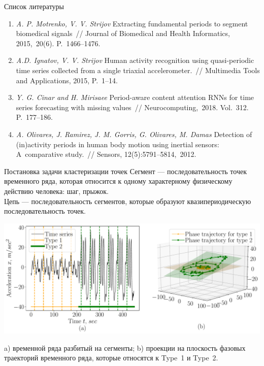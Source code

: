 \documentclass[9pt,pdf,hyperref={unicode}]{beamer}
\begin{document}
\begin{frame}{Список литературы}
	\begin{enumerate}
	\justifying
		\item \textit{A. P. Motrenko, V. V. Strijov} Extracting fundamental periods to segment biomedical signals~// Journal of Biomedical and Health Informatics, 2015,~20(6). P.~1466--1476.
		\item \textit{A.D. Ignatov, V. V. Strijov} Human activity recognition using quasi-periodic time series collected from a single triaxial accelerometer.~// Multimedia Tools and Applications, 2015, P.~1--14.

		
		\item \textit{Y. G. Cinar and H. Mirisaee} Period-aware content attention RNNs for time series forecasting with missing values~// Neurocomputing,~2018. Vol.~312. P.~177--186.
		
		\item \textit{A. Olivares, J. Ramirez, J. M. Gorris, G. Olivares, M. Damas} Detection of (in)activity periods in human body motion using inertial sensors: A~comparative study.~// Sensors, 12(5):5791--5814,~2012.
		
	\end{enumerate}
\end{frame}

\begin{frame}{Постановка задачи кластеризации точек}
\justifying
Сегмент --- последовательность точек временного ряда, которая относится к одному характерному физическому действию человека: шаг, прыжок.\\
Цепь --- последовательность сегментов, которые образуют квазипериодическую последовательность точек.

\begin{center}
	\includegraphics[width=1\textwidth]{results/introduction}
\end{center}

a) временной ряда разбитый на сегменты; b) проекции на плоскость фазовых траекторий временного ряда, которые относятся к Type~1 и Type~2.

\end{frame}
\end{document}
